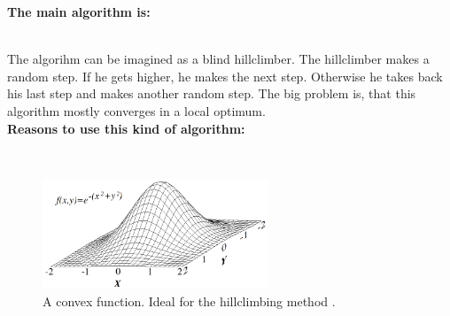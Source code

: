 \documentclass[10pt,a4paper,DIV=11]{scrreprt}
\begin{document}
\textbf{The main algorithm is:}

 \\

The algorihm can be imagined as a blind hillclimber. The hillclimber makes a random step. If he gets higher, he makes the next step. Otherwise he takes back his last step and makes another random step. The big problem is, that this algorithm mostly converges in a local optimum. \\

\textbf{Reasons to use this kind of algorithm:}

   \\



\begin{center}
	\begin{figure}[H]
		\centering
		\includegraphics[width=0.6\textwidth,scale=1]{files/Hill_climb.png}  
		\caption{A convex function. Ideal for the hillclimbing method \cite{wiki-hill}.}
		\label{fig:hill}
	\end{figure}
\end{center}
\end{document}
